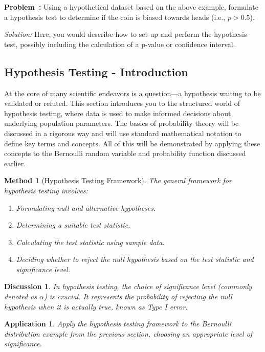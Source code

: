 \documentclass[a4paper,12pt]{book}
\newcounter{problem}
\newenvironment{problem}[1][\theproblem]
{\refstepcounter{problem}\par\medskip\noindent\textbf{Problem~#1:} \rmfamily}{\medskip}
\newenvironment{solution}[1][]
{\par\noindent\textit{Solution:} \rmfamily}{\medskip}
\newcounter{example}
\newtheorem{application}{Application}
\newtheorem{method}{Method}
\newtheorem{discussion}{Discussion}
\begin{document}
\begin{problem}
Using a hypothetical dataset based on the above example, formulate a hypothesis test to determine if the coin is biased towards heads (i.e., $p > 0.5$).
\end{problem}

\begin{solution}
Here, you would describe how to set up and perform the hypothesis test, possibly including the calculation of a p-value or confidence interval.
\end{solution}

\subsection{Hypothesis Testing - Introduction}
At the core of many scientific endeavors is a question—a hypothesis waiting to be validated or refuted. This section introduces you to the structured world of hypothesis testing, where data is used to make informed decisions about underlying population parameters. The basics of probability theory will be discussed in a rigorous way and will use standard mathematical notation to define key terms and concepts. All of this will be demonstrated by applying these concepts to the Bernoulli random variable and probability function discussed earlier.

\begin{method}[Hypothesis Testing Framework]
The general framework for hypothesis testing involves:
\begin{enumerate}
    \item Formulating null and alternative hypotheses.
    \item Determining a suitable test statistic.
    \item Calculating the test statistic using sample data.
    \item Deciding whether to reject the null hypothesis based on the test statistic and significance level.
\end{enumerate}
\end{method}

\begin{discussion}
In hypothesis testing, the choice of significance level (commonly denoted as $\alpha$) is crucial. It represents the probability of rejecting the null hypothesis when it is actually true, known as Type I error.
\end{discussion}

\begin{application}
Apply the hypothesis testing framework to the Bernoulli distribution example from the previous section, choosing an appropriate level of significance.
\end{application}
\end{document}
